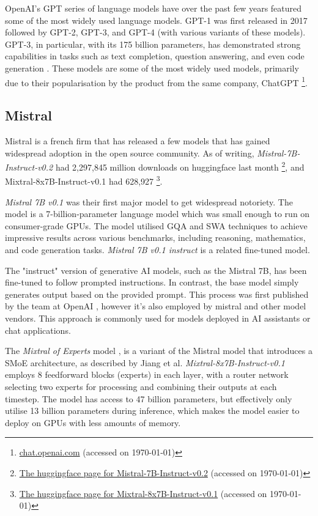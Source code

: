 OpenAI's \gls{GPT} series of language models have over the past few years featured some of the most widely used language models. GPT-1 was first released in 2017 followed by GPT-2, GPT-3, and GPT-4 (with various variants of these models). GPT-3, in particular, with its 175 billion parameters, has demonstrated strong capabilities in tasks such as text completion, question answering, and even code generation \cite{brown_language_2020}. These models are some of the most widely used models, primarily due to their popularisation by the product from the same company, ChatGPT \footnote{\href{https://chat.openai.com}{chat.openai.com} (accessed on \today)}.


\subsection{Mistral}
\label{sec:mistral_models}


Mistral is a french firm that has released a few models that has gained widespread adoption in the open source community. As of writing, \textit{Mistral-7B-Instruct-v0.2} had 2,297,845 million downloads on huggingface last month \footnote{\href{https://huggingface.co/mistralai/Mistral-7B-Instruct-v0.2}{The huggingface page for Mistral-7B-Instruct-v0.2} (accessed on \today)}, and Mixtral-8x7B-Instruct-v0.1 had 628,927 \footnote{\href{https://huggingface.co/mistralai/Mixtral-8x7B-Instruct-v0.1}{The huggingface page for Mixtral-8x7B-Instruct-v0.1} (accessed on \today)}.


\textit{Mistral 7B v0.1} \cite{jiang_mistral_2023} was their first major model to get widespread notoriety. The model is a 7-billion-parameter language model which was small enough to run on consumer-grade GPUs. The model utilised \gls{GQA}\cite{ainslie_gqa_2023} and \gls{SWA} \cite{roy_efficient_2020} techniques to achieve impressive results across various benchmarks, including reasoning, mathematics, and code generation tasks. \textit{Mistral 7B v0.1 instruct} is a related fine-tuned model.


The "instruct" version of generative AI models, such as the Mistral 7B, has been fine-tuned to follow prompted instructions. In contrast, the base model simply generates output based on the provided prompt. This process was first published by the team at OpenAI \cite{ouyang_training_2022}, however it’s also employed by mistral and other model vendors. This approach is commonly used for models deployed in AI assistants or chat applications.


The \textit{Mixtral of Experts} model \cite{jiang_mixtral_2024}, is a variant of the Mistral model that introduces a \gls{SMoE} architecture, as described by Jiang et al. \textit{Mixtral-8x7B-Instruct-v0.1} employs 8 feedforward blocks (experts) in each layer, with a router network selecting two experts for processing and combining their outputs at each timestep. The model has access to 47 billion parameters, but effectively only utilise 13 billion parameters during inference, which makes the model easier to deploy on GPUs with less amounts of memory.


